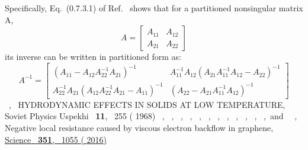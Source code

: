 \documentclass[
prb,
twocolumn,
superscriptaddress,
 amsmath,amssymb,
 aps,
longbibliography,
]{revtex4-2}
\begin{document}
\begin{thebibliography}{150}
   {Specifically, Eq.~(0.7.3.1) of Ref.~\cite {hornTopicsMatrixAnalysis1991} shows that for a partitioned nonsingular matrix A, \begin {equation}A=\left [\begin {array}{ll} A_{11} & A_{12} \\ A_{21} & A_{22} \end {array}\right ] \end {equation} its inverse can be written in partitioned form as: {\relax \protect \fontsize {5}{6}\protect \selectfont \begin {equation} A^{-1}{=}\left [\begin {array}{lc} \left (A_{11}-A_{12} A_{22}^{-1} A_{21}\right )^{-1} & A_{11}^{-1} A_{12}\left (A_{21} A_{11}^{-1} A_{12}-A_{22}\right )^{-1} \\ A_{22}^{-1} A_{21}\left (A_{12} A_{22}^{-1} A_{21}-A_{11}\right )^{-1} & \left (A_{22}-A_{21} A_{11}^{-1} A_{12}\right )^{-1} \end {array}\right ] \end {equation}}}
  \BibitemOpen
   { {\ },\ } { {{HYDRODYNAMIC} {EFFECTS} {IN} {SOLIDS} {AT} {LOW} {TEMPERATURE}},\ }\href@noop {} { { {Soviet Physics Uspekhi}\ }\textbf { {11}},\  {255} ( {1968})}
  \BibitemOpen
   { {\ },  {~},  {\ },  {~},  {~},  {~},  {\ },  {~},  {\ },  {\ },  {\ },  {\ },\ and\  {~},\ } { {Negative local resistance caused by viscous electron backflow in graphene},\ }\href {https://www.science.org/doi/10.1126/science.aad0201} { { {Science}\ }\textbf { {351}},\  {1055} ( {2016})}

\end{thebibliography}
\end{document}
